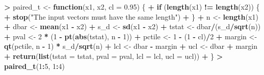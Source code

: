 \documentclass[]{krantz}
\makeatletter
\newenvironment{Shaded}{\begin{snugshade}}{\end{snugshade}}
\newcommand{\ControlFlowTok}[1]{\textcolor[rgb]{0.27,0.27,0.27}{\textbf{#1}}}
\newcommand{\DataTypeTok}[1]{\textcolor[rgb]{0.27,0.27,0.27}{#1}}
\newcommand{\DecValTok}[1]{\textcolor[rgb]{0.06,0.06,0.06}{#1}}
\newcommand{\FloatTok}[1]{\textcolor[rgb]{0.06,0.06,0.06}{#1}}
\newcommand{\KeywordTok}[1]{\textcolor[rgb]{0.27,0.27,0.27}{\textbf{#1}}}
\newcommand{\NormalTok}[1]{#1}
\newcommand{\OperatorTok}[1]{\textcolor[rgb]{0.43,0.43,0.43}{\textbf{#1}}}
\newcommand{\StringTok}[1]{\textcolor[rgb]{0.5,0.5,0.5}{#1}}
\newenvironment{kframe}{%
\medskip{}
\setlength{\fboxsep}{.8em}
 \def\at@end@of@kframe{}%
 \ifinner\ifhmode%
  \def\at@end@of@kframe{\end{minipage}}%
  \begin{minipage}{\columnwidth}%
 \fi\fi%
 \def\FrameCommand##1{\hskip\@totalleftmargin \hskip-\fboxsep
 \colorbox{shadecolor}{##1}\hskip-\fboxsep
     \hskip-\linewidth \hskip-\@totalleftmargin \hskip\columnwidth}%
 \MakeFramed {\advance\hsize-\width
   \@totalleftmargin\z@ \linewidth\hsize
   \@setminipage}}%
 {\par\unskip\endMakeFramed%
 \at@end@of@kframe}
\renewenvironment{Shaded}{\begin{kframe}}{\end{kframe}}
\makeatother
\begin{document}
\begin{Shaded}
\begin{Highlighting}[]
\OperatorTok{>}\StringTok{ }\NormalTok{paired_t <-}\StringTok{ }\ControlFlowTok{function}\NormalTok{(x1, x2, }\DataTypeTok{cl =} \FloatTok{0.95}\NormalTok{) \{}
\OperatorTok{+}\StringTok{   }\ControlFlowTok{if}\NormalTok{ (}\KeywordTok{length}\NormalTok{(x1) }\OperatorTok{!=}\StringTok{ }\KeywordTok{length}\NormalTok{(x2)) \{}
\OperatorTok{+}\StringTok{     }\KeywordTok{stop}\NormalTok{(}\StringTok{"The input vectors  must have the same length"}\NormalTok{)}
\OperatorTok{+}\StringTok{   }\NormalTok{\}}
\OperatorTok{+}\StringTok{   }\NormalTok{n <-}\StringTok{ }\KeywordTok{length}\NormalTok{(x1)}
\OperatorTok{+}\StringTok{   }\NormalTok{dbar <-}\StringTok{ }\KeywordTok{mean}\NormalTok{(x1 }\OperatorTok{-}\StringTok{ }\NormalTok{x2)}
\OperatorTok{+}\StringTok{   }\NormalTok{s_d <-}\StringTok{ }\KeywordTok{sd}\NormalTok{(x1 }\OperatorTok{-}\StringTok{ }\NormalTok{x2)}
\OperatorTok{+}\StringTok{   }\NormalTok{tstat <-}\StringTok{ }\NormalTok{dbar}\OperatorTok{/}\NormalTok{(s_d}\OperatorTok{/}\KeywordTok{sqrt}\NormalTok{(n))}
\OperatorTok{+}\StringTok{   }\NormalTok{pval <-}\StringTok{ }\DecValTok{2} \OperatorTok{*}\StringTok{ }\NormalTok{(}\DecValTok{1} \OperatorTok{-}\StringTok{ }\KeywordTok{pt}\NormalTok{(}\KeywordTok{abs}\NormalTok{(tstat), n }\OperatorTok{-}\StringTok{ }\DecValTok{1}\NormalTok{))}
\OperatorTok{+}\StringTok{   }\NormalTok{pctile <-}\StringTok{ }\DecValTok{1} \OperatorTok{-}\StringTok{ }\NormalTok{(}\DecValTok{1} \OperatorTok{-}\StringTok{ }\NormalTok{cl)}\OperatorTok{/}\DecValTok{2}
\OperatorTok{+}\StringTok{   }\NormalTok{margin <-}\StringTok{ }\KeywordTok{qt}\NormalTok{(pctile, n }\OperatorTok{-}\StringTok{ }\DecValTok{1}\NormalTok{) }\OperatorTok{*}\StringTok{ }\NormalTok{s_d}\OperatorTok{/}\KeywordTok{sqrt}\NormalTok{(n)}
\OperatorTok{+}\StringTok{   }\NormalTok{lcl <-}\StringTok{ }\NormalTok{dbar }\OperatorTok{-}\StringTok{ }\NormalTok{margin}
\OperatorTok{+}\StringTok{   }\NormalTok{ucl <-}\StringTok{ }\NormalTok{dbar }\OperatorTok{+}\StringTok{ }\NormalTok{margin}
\OperatorTok{+}\StringTok{   }\KeywordTok{return}\NormalTok{(}\KeywordTok{list}\NormalTok{(}\DataTypeTok{tstat =}\NormalTok{ tstat, }\DataTypeTok{pval =}\NormalTok{ pval, }\DataTypeTok{lcl =}\NormalTok{ lcl, }\DataTypeTok{ucl =}\NormalTok{ ucl))}
\OperatorTok{+}\StringTok{ }\NormalTok{\}}
\OperatorTok{>}\StringTok{ }\KeywordTok{paired_t}\NormalTok{(}\DecValTok{1}\OperatorTok{:}\DecValTok{5}\NormalTok{, }\DecValTok{1}\OperatorTok{:}\DecValTok{4}\NormalTok{)}
\end{Highlighting}
\end{Shaded}
\end{document}
